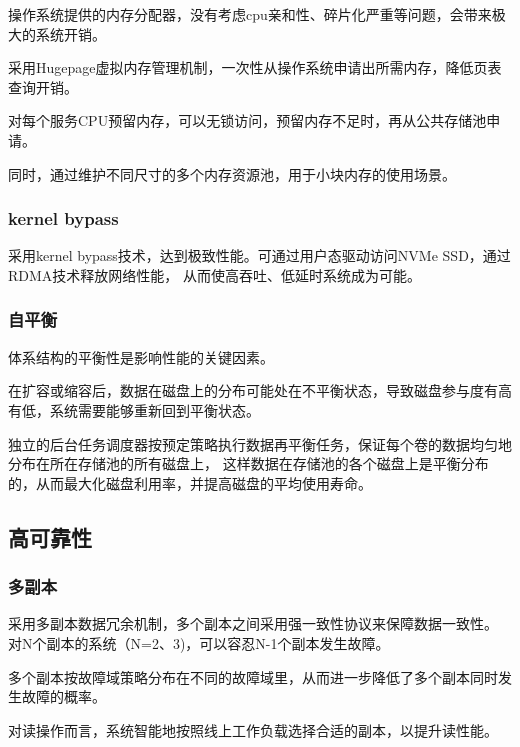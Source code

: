 操作系统提供的内存分配器，没有考虑cpu亲和性、碎片化严重等问题，会带来极大的系统开销。

采用Hugepage虚拟内存管理机制，一次性从操作系统申请出所需内存，降低页表查询开销。

对每个服务CPU预留内存，可以无锁访问，预留内存不足时，再从公共存储池申请。

同时，通过维护不同尺寸的多个内存资源池，用于小块内存的使用场景。


\subsubsection{kernel bypass}

采用kernel bypass技术，达到极致性能。可通过用户态驱动访问NVMe SSD，通过RDMA技术释放网络性能，
从而使高吞吐、低延时系统成为可能。

\subsubsection{自平衡}

体系结构的平衡性是影响性能的关键因素。

在扩容或缩容后，数据在磁盘上的分布可能处在不平衡状态，导致磁盘参与度有高有低，系统需要能够重新回到平衡状态。

独立的后台任务调度器按预定策略执行数据再平衡任务，保证每个卷的数据均匀地分布在所在存储池的所有磁盘上，
这样数据在存储池的各个磁盘上是平衡分布的，从而最大化磁盘利用率，并提高磁盘的平均使用寿命。

\subsection{高可靠性}

\subsubsection{多副本}

采用多副本数据冗余机制，多个副本之间采用强一致性协议来保障数据一致性。
对N个副本的系统（N=2、3)，可以容忍N-1个副本发生故障。

多个副本按故障域策略分布在不同的故障域里，从而进一步降低了多个副本同时发生故障的概率。

对读操作而言，系统智能地按照线上工作负载选择合适的副本，以提升读性能。

